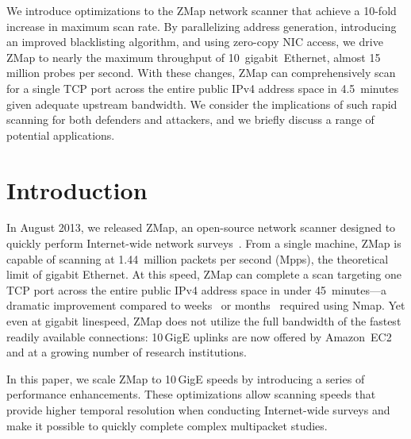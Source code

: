 We introduce optimizations to the ZMap network scanner that achieve a 10-fold
increase in maximum scan rate. By parallelizing address generation,
introducing an improved blacklisting algorithm, and using zero-copy NIC
access, we drive ZMap to nearly the maximum throughput of
10~gigabit~Ethernet, almost 15 million probes per second. With these changes,
ZMap can comprehensively scan for a single TCP port across the entire public
IPv4 address space in 4.5~minutes given adequate upstream bandwidth. We
consider the implications of such rapid scanning for both defenders and
attackers, and we briefly discuss a range of potential
applications.

\section{Introduction}
\label{sec:introduction}

In August 2013, we released ZMap, an open-source network scanner designed to
quickly perform Internet-wide network surveys~\cite{zmap-2013}. From a single
machine, ZMap is capable of scanning at 1.44~million packets per second
(Mpps), the theoretical limit of gigabit Ethernet. At this speed, ZMap can
complete a scan targeting one TCP port across the entire public IPv4 address
space in under 45~minutes---a dramatic improvement compared to
weeks~\cite{zmap-2013} or months~\cite{ssl-observatory-2010} required using Nmap. Yet
even at gigabit linespeed, ZMap does not utilize the full bandwidth of the
fastest readily available connections: 10\,GigE uplinks are now offered by
Amazon~EC2~\cite{amazon-10g} and at a growing number of research
institutions. 

In this paper, we scale ZMap to 10\,GigE speeds by introducing a series of
performance enhancements. These optimizations allow scanning speeds that
provide higher temporal resolution when conducting Internet-wide surveys and
make it possible to quickly complete complex multipacket studies.


